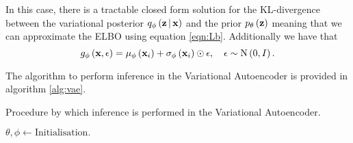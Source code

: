 \documentclass[../report.tex]{subfiles}
\begin{document}
In this case, there is a tractable closed form solution for the KL-divergence between the variational posterior $q_\phi \left(\mathbf{z} \, \middle\vert \, \mathbf{x} \right)$ and the prior $p_\theta \left( \mathbf{z}\right)$ meaning that we can approximate the ELBO using equation \ref{eqn:Lb}. Additionally we have that
\begin{equation}
  g_\phi \left( \mathbf{x}, \epsilon\right) = \mu_\phi \left( \mathbf{x}_i\right) + \sigma_\phi \left( \mathbf{x}_i\right) \odot \epsilon, \quad \epsilon \sim \textrm{N} \left( 0, I\right).
\end{equation}

The algorithm to perform inference in the Variational Autoencoder is provided in algorithm \ref{alg:vae}.

\begin{algorithm}[!bthp]
\caption{Procedure by which inference is performed in the Variational Autoencoder.}
\label{alg:vae}
\begin{algorithmic}
\State $\theta, \phi \gets \textrm{Initialisation}.$
\EndWhile
\end{algorithmic}
\end{algorithm}
\end{document}
